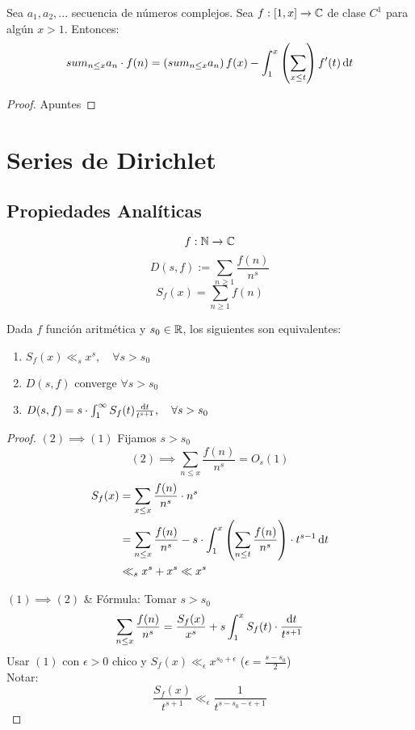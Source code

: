 \begin{thm}
	Sea $a_1,a_2,...$ secuencia de números complejos. Sea $f:[1,x]\xrightarrow[]{}\mathbb{C}$ de clase $C^1$ para algún $x>1$. Entonces:
	\[sum_{n\leq x}a_n\cdot f(n)=\left(sum_{n\leq x}a_n\right)f(x)-\int^x_1\left(\sum_{x\leq t}\right)f'(t)\operatorname{d}\!{t}\]
\end{thm}
\begin{proof}
	Apuntes
\end{proof}

\section{Series de Dirichlet}
\subsection{Propiedades Analíticas}
\[f:\mathbb{N}\xrightarrow[]{}\mathbb{C}\]
\[D(s,f):=\sum_{n\geq 1}\frac{f(n)}{n^s}\]
\[S_f(x)=\sum_{n\geq 1}f(n)\]
\begin{thm}
	Dada $f$ función aritmética y $s_0\in\mathbb{R}$, los siguientes son equivalentes:
	\begin{enumerate}[label=(\arabic*)]
		\item $S_f(x)\ll_s x^s,\quad\forall s>s_0$

		\item $D(s,f)$ converge $\forall s>s_0$

		\item $D(s,f)=s\cdot\int^\infty_1S_f(t)\frac{\operatorname{d}\!{t}}{t^{s+1}},\quad\forall s>s_0$
	\end{enumerate}
\end{thm}
\begin{proof}
	$(2)\implies (1)$ Fijamos $s>s_0$
	\[(2)\implies \sum_{n\leq x}\frac{f(n)}{n^s}=O_s(1)\]
	\begin{align}
		S_f(x) & =\sum_{x\leq x}\frac{f(n)}{n^s}\cdot n^s                                                                    \\
		       & =\sum_{n\leq x}\frac{f(n)}{n^s}-s\cdot\int^x_1\left(\sum_{n\leq t}\frac{f(n)}{n^s}\right)\cdot t^{s-1}\operatorname{d}\!{t} \\
		       & \ll_s x^s+x^s\ll x^s
	\end{align}

	$(1)\implies (2)$ \& Fórmula: Tomar $s>s_0$
	\[\sum_{n\leq x}\frac{f(n)}{n^s}=\frac{S_f(x)}{x^s}+s\int^x_1S_f(t)\cdot\frac{\operatorname{d}\!{t}}{t^{s+1}}\]
	Usar $(1)$ con $\epsilon>0$ chico y $S_f(x)\ll_\epsilon x^{s_0+\epsilon}$ ($\epsilon=\frac{s-s_0}{2}$)\\
	Notar:
	\[\frac{S_f(x)}{t^{s+1}}\ll_\epsilon\frac{1}{t^{s-s_0-\epsilon+1}}\]
\end{proof}


